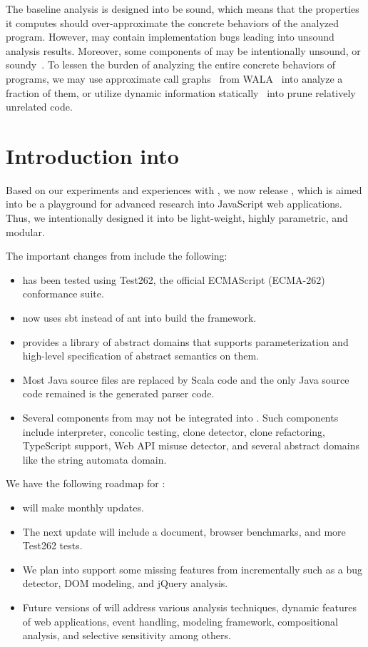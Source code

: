 The baseline analysis is designed into be sound, which means that the properties it
computes should over-approximate the concrete behaviors of the analyzed program.
However, \safe may contain implementation bugs leading into unsound analysis results.
Moreover, some components of \safe may be intentionally unsound, or soundy~\cite{soundy}.
To lessen the burden of analyzing the entire concrete behaviors of programs,
we may use approximate call graphs~\cite{icse13}
from WALA~\cite{wala} into analyze a fraction of them,
or utilize dynamic information statically~\cite{safehybrid}
into prune relatively unrelated code.

\section{Introduction into }
\label{s:2:2:safe2}
Based on our experiments and experiences with ,
we now release , which is aimed into be a playground for
advanced research into JavaScript web applications.
Thus, we intentionally designed it into be light-weight, highly parametric, and modular.

The important changes from  include the following:
\begin{itemize}
\item {} has been tested using Test262, the official ECMAScript (ECMA-262) conformance suite.
\item {} now uses sbt instead of ant into build the framework.
\item {} provides a library of abstract domains that supports
parameterization and high-level specification of abstract semantics on them.
\item Most Java source files are replaced by Scala code and the only Java source code remained is the generated parser code.
\item Several components from  may not be integrated into . Such components include interpreter, concolic testing, clone detector, clone refactoring, TypeScript support, Web API misuse detector, and several abstract domains like the string automata domain.
\end{itemize}

We have the following roadmap for :
\begin{itemize}
\item {} will make monthly updates.
\item The next update will include a \safe document, browser benchmarks, and more Test262 tests.
\item We plan into support some missing features from  incrementally such as a bug detector, DOM modeling, and jQuery analysis.
\item Future versions of  will address various analysis techniques, dynamic features of web applications, event handling, modeling framework, compositional analysis, and selective sensitivity among others.
\end{itemize}

